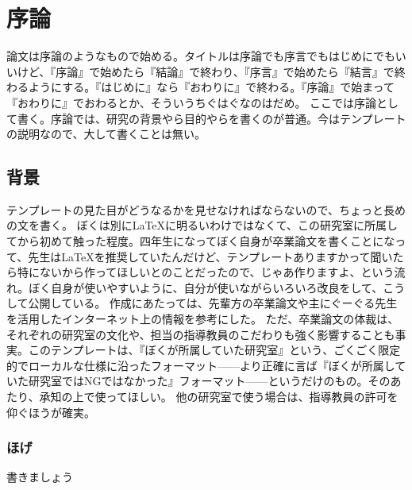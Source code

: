 \chapter{序論}
論文は序論のようなもので始める。タイトルは序論でも序言でもはじめにでもいいけど、『序論』で始めたら『結論』で終わり、『序言』で始めたら『結言』で終わるようにする。『はじめに』なら『おわりに』で終わる。『序論』で始まって『おわりに』でおわるとか、そういうちぐはぐなのはだめ。
ここでは序論として書く。序論では、研究の背景やら目的やらを書くのが普通。今はテンプレートの説明なので、大して書くことは無い。

\section{背景}
テンプレートの見た目がどうなるかを見せなければならないので、ちょっと長めの文を書く。
ぼくは別に\LaTeX に明るいわけではなくて、この研究室に所属してから初めて触った程度。四年生になってぼく自身が卒業論文を書くことになって、先生は\LaTeX を推奨していたんだけど、テンプレートありますかって聞いたら特にないから作ってほしいとのことだったので、じゃあ作りますよ、という流れ。ぼく自身が使いやすいように、自分が使いながらいろいろ改良をして、こうして公開している。
作成にあたっては、先輩方の卒業論文や主にぐーぐる先生を活用したインターネット上の情報を参考にした。
ただ、卒業論文の体裁は、それぞれの研究室の文化や、担当の指導教員のこだわりも強く影響することも事実。このテンプレートは、『ぼくが所属していた研究室』という、ごくごく限定的でローカルな仕様に沿ったフォーマット——より正確に言ば『ぼくが所属していた研究室ではNGではなかった』フォーマット——というだけのもの。そのあたり、承知の上で使ってほしい。
他の研究室で使う場合は、指導教員の許可を仰ぐほうが確実。

\subsection{ほげ}
書きましょう
